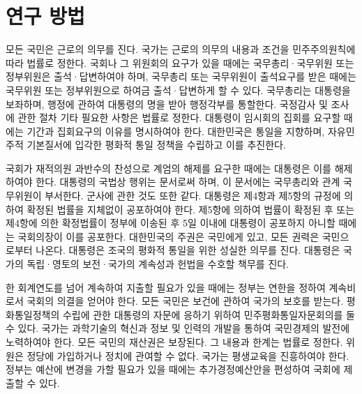 \documentclass[../document.tex]{subfiles}
\begin{document}
\section{연구 방법}


모든 국민은 근로의 의무를 진다. 국가는 근로의 의무의 내용과 조건을 민주주의원칙에 따라 법률로 정한다. 국회나 그 위원회의 요구가 있을 때에는 국무총리·국무위원 또는 정부위원은 출석·답변하여야 하며, 국무총리 또는 국무위원이 출석요구를 받은 때에는 국무위원 또는 정부위원으로 하여금 출석·답변하게 할 수 있다. 국무총리는 대통령을 보좌하며, 행정에 관하여 대통령의 명을 받아 행정각부를 통할한다. 국정감사 및 조사에 관한 절차 기타 필요한 사항은 법률로 정한다. 대통령이 임시회의 집회를 요구할 때에는 기간과 집회요구의 이유를 명시하여야 한다. 대한민국은 통일을 지향하며, 자유민주적 기본질서에 입각한 평화적 통일 정책을 수립하고 이를 추진한다.

국회가 재적의원 과반수의 찬성으로 계엄의 해제를 요구한 때에는 대통령은 이를 해제하여야 한다. 대통령의 국법상 행위는 문서로써 하며, 이 문서에는 국무총리와 관계 국무위원이 부서한다. 군사에 관한 것도 또한 같다. 대통령은 제4항과 제5항의 규정에 의하여 확정된 법률을 지체없이 공포하여야 한다. 제5항에 의하여 법률이 확정된 후 또는 제4항에 의한 확정법률이 정부에 이송된 후 5일 이내에 대통령이 공포하지 아니할 때에는 국회의장이 이를 공포한다. 대한민국의 주권은 국민에게 있고, 모든 권력은 국민으로부터 나온다. 대통령은 조국의 평화적 통일을 위한 성실한 의무를 진다. 대통령은 국가의 독립·영토의 보전·국가의 계속성과 헌법을 수호할 책무를 진다.

한 회계연도를 넘어 계속하여 지출할 필요가 있을 때에는 정부는 연한을 정하여 계속비로서 국회의 의결을 얻어야 한다. 모든 국민은 보건에 관하여 국가의 보호를 받는다. 평화통일정책의 수립에 관한 대통령의 자문에 응하기 위하여 민주평화통일자문회의를 둘 수 있다. 국가는 과학기술의 혁신과 정보 및 인력의 개발을 통하여 국민경제의 발전에 노력하여야 한다. 모든 국민의 재산권은 보장된다. 그 내용과 한계는 법률로 정한다. 위원은 정당에 가입하거나 정치에 관여할 수 없다. 국가는 평생교육을 진흥하여야 한다. 정부는 예산에 변경을 가할 필요가 있을 때에는 추가경정예산안을 편성하여 국회에 제출할 수 있다.

\biblio
\end{document}
